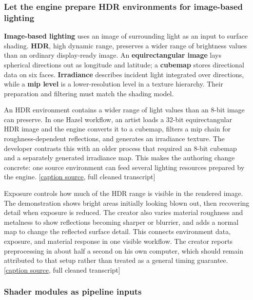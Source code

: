 \subsubsection{Let the engine prepare HDR environments for image-based lighting}\label{06-engine-ii-ch025-let-the-engine-prepare-hdr-environments-for-image-based-lighting}

\hypertarget{06-engine-ii-ch025-let-the-engine-prepare-hdr-environments-for-image-based-lighting}{}

\textbf{Image-based lighting} uses an image of surrounding light as an input to surface shading. \textbf{HDR}, high dynamic range, preserves a wider range of brightness values than an ordinary display-ready image. An \textbf{equirectangular image} lays spherical directions out as longitude and latitude; a \textbf{cubemap} stores directional data on six faces. \textbf{Irradiance} describes incident light integrated over directions, while a \textbf{mip level} is a lower-resolution level in a texture hierarchy. Their preparation and filtering must match the shading model.

An HDR environment contains a wider range of light values than an 8-bit image can preserve. In one Hazel workflow, an artist loads a 32-bit equirectangular HDR image and the engine converts it to a cubemap, filters a mip chain for roughness-dependent reflections, and generates an irradiance texture. The developer contrasts this with an older process that required an 8-bit cubemap and a separately generated irradiance map. This makes the authoring change concrete: one source environment can feed several lighting resources prepared by the engine. {[}\href{https://www.youtube.com/watch?v=mzJ60W8I_bk}{caption source}, full cleaned transcript{]}

Exposure controls how much of the HDR range is visible in the rendered image. The demonstration shows bright areas initially looking blown out, then recovering detail when exposure is reduced. The creator also varies material roughness and metalness to show reflections becoming sharper or blurrier, and adds a normal map to change the reflected surface detail. This connects environment data, exposure, and material response in one visible workflow. The creator reports preprocessing in about half a second on his own computer, which should remain attributed to that setup rather than treated as a general timing guarantee. {[}\href{https://www.youtube.com/watch?v=mzJ60W8I_bk}{caption source}, full cleaned transcript{]}

\subsubsection{Shader modules as pipeline inputs}\label{06-engine-ii-ch025-shader-modules-as-pipeline-inputs}

